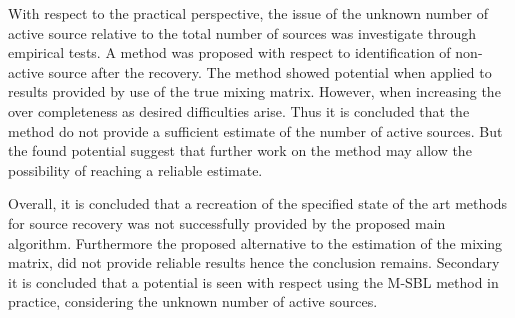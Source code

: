 With respect to the practical perspective, the issue of the unknown number of active source relative to the total number of sources was investigate through empirical tests. A method was proposed with respect to identification of non-active source after the recovery. The method showed potential when applied to results provided by use of the true mixing matrix. However, when increasing the over completeness as desired       difficulties arise. Thus it is concluded that the method do not provide a sufficient estimate of the number of active sources. But the found potential suggest that further work on the method may allow the possibility of reaching a reliable estimate.  

Overall, it is concluded that a recreation of the specified state of the art methods for source recovery was not successfully provided by the proposed main algorithm. Furthermore the proposed alternative to the estimation of the mixing matrix, did not provide reliable results hence the conclusion remains. 
Secondary it is concluded that a potential is seen with respect using the M-SBL method in practice, considering the unknown number of active sources.      
 




